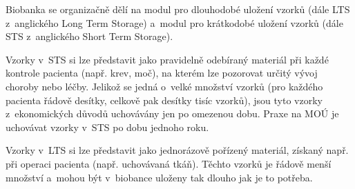 \documentclass[11pt, draft, oneside]{fithesis2}
\begin{document}
Biobanka se organizačně dělí na modul pro dlouhodobé uložení vzorků (dále LTS z~anglického Long Term Storage) a~modul pro krátkodobé uložení vzorků (dále STS z~anglického Short Term Storage). 

Vzorky v~STS si lze představit jako pravidelně odebíraný materiál při každé kontrole pacienta (např. krev, moč), na kterém lze pozorovat určitý vývoj choroby nebo léčby. Jelikož se jedná o~velké množství vzorků (pro každého pacienta řádově desítky, celkově pak desítky tisíc vzorků), jsou tyto vzorky z~ekonomických důvodů uchovávány jen po omezenou dobu. Praxe na MOÚ je uchovávat vzorky v~STS po dobu jednoho roku.

Vzorky v~LTS si lze představit jako jednorázově pořízený materiál, získaný např. při operaci pacienta (např. uchovávaná tkáň). 
Těchto vzorků je řádově menší množství a~mohou být v~biobance uloženy tak dlouho jak je to potřeba.
\end{document}
